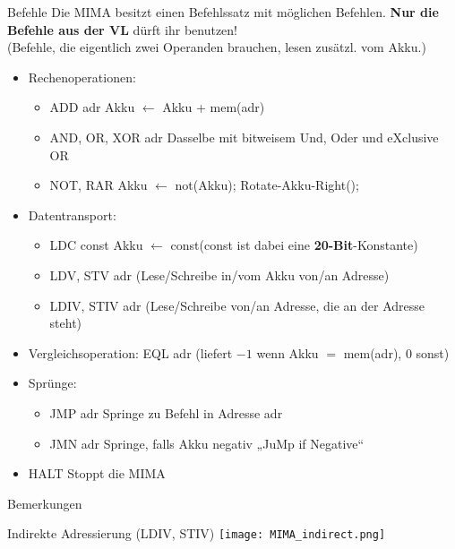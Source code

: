 \newcommand{\itemizeconfig}{\setlength{\parsep}{0pt}\setlength{\parskip}{0pt}\setlength{\topsep}{0pt}\setlength{\partopsep}{0pt}}
\newcommand{\explain}[1]{\hfill {\small #1 }}
\begin{frame}{Befehle}
	Die MIMA besitzt einen Befehlssatz mit möglichen Befehlen. %
	\textbf{Nur die Befehle aus der VL} dürft ihr benutzen! \\ 
	\smallskip
	(Befehle, die eigentlich zwei Operanden brauchen, lesen zusätzl. vom Akku.)
	{
	\begin{itemize}[<+->] \itemizeconfig
		\item Rechenoperationen:
		\begin{itemize} 
			\item ADD adr \explain{Akku $\leftarrow$ Akku + mem(adr)}
			\item AND, OR, XOR adr \explain{Dasselbe mit bitweisem Und, Oder und eXclusive OR}
			\item NOT, RAR \explain{Akku $\leftarrow$ not(Akku); \quad  Rotate-Akku-Right();}
		\end{itemize}
		\item Datentransport:
		\begin{itemize}
			\item LDC const \explain{Akku $\leftarrow$ const\quad (const ist dabei eine \textbf{20-Bit}-Konstante) }
			\item LDV, STV adr \explain{(Lese/Schreibe in/vom Akku von/an Adresse)}
			\item LDIV, STIV adr \explain{(Lese/Schreibe von/an Adresse, die an der Adresse steht)}
		\end{itemize}
		\item Vergleichsoperation: EQL adr \explain{(liefert $-1$ wenn Akku $=$ mem(adr), 0 sonst)}
		\item Sprünge:
		\begin{itemize}
			\item JMP adr \explain{Springe zu Befehl in Adresse adr}
			\item JMN adr \explain{Springe, falls Akku negativ \quad „JuMp if Negative“}
		\end{itemize}
		\item HALT \explain{Stoppt die MIMA}
	\end{itemize}}
\end{frame}

\begin{frame}{Bemerkungen}
	\begin{block}{Indirekte Adressierung (LDIV, STIV)}
		\centering
		\texttt{[image: MIMA\_indirect.png]}
	\end{block}
	
\end{frame}

